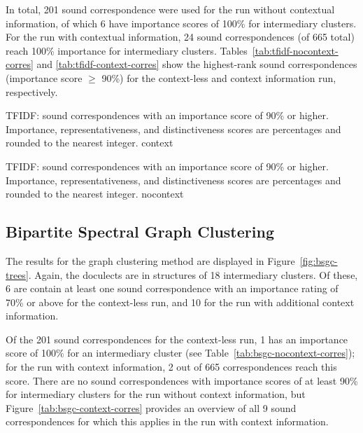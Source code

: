 \documentclass[a4paper]{article}
\begin{document}
In total, 201 sound correspondence were used for the run without contextual information,
of which 6 have importance scores of 100\% for intermediary clusters.
For the run with contextual information,
24 sound correspondences (of 665 total) reach 100\% importance for intermediary clusters.
Tables~\ref{tab:tfidf-nocontext-corres} and \ref{tab:tfidf-context-corres}
show the highest-rank sound correspondences (importance score $\geq$ 90\%)
for the context-less and context information run, respectively.

\begin{table}[h]
\centering

\caption{TFIDF: sound correspondences with an importance score of 90\% or higher.
Importance, representativeness, and distinctiveness scores are percentages and rounded to the nearest integer.
context
}
\label{tab:tfidf-context-corres}
\end{table}

\begin{table}[h]
\centering

\caption{TFIDF: sound correspondences with an importance score of 90\% or higher.
Importance, representativeness, and distinctiveness scores are percentages and rounded to the nearest integer.
nocontext}
\label{tab:tfidf-nocontext-corres}
\end{table}

\subsection{Bipartite Spectral Graph Clustering}

The results for the graph clustering method are
displayed in Figure~\ref{fig:bsgc-trees}.
Again, the doculects are in structures of 18 intermediary clusters.
Of these, 6 are contain at least one sound correspondence
with an importance rating of 70\% or above for the context-less run,
and 10 for the run with additional context information.

Of the 201 sound correspondences for the context-less run,
1 has an importance score of 100\% for an intermediary cluster
(see Table~\ref{tab:bsgc-nocontext-corres});
for the run with context information, 2 out of 665 correspondences reach this score.
There are no sound correspondences with importance scores of at least 90\%
for intermediary clusters for the run without context information,
but Figure~\ref{tab:bsgc-context-corres} provides an overview of
all 9 sound correspondences for which this applies
in the run with context information.
\end{document}
